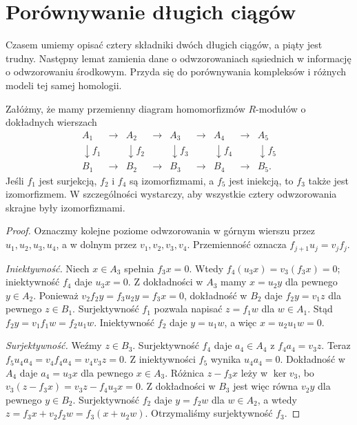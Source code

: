 \section{Porównywanie długich ciągów}
\label{sec:lemat-pieciu}

Czasem umiemy opisać cztery składniki
dwóch długich ciągów, a piąty jest trudny.
Następny lemat zamienia dane o odwzorowaniach
sąsiednich w informację o odwzorowaniu środkowym.
Przyda się do porównywania kompleksów
i różnych modeli tej samej homologii.

\begin{lemat}
\label{lem:pieciu}
Załóżmy, że mamy przemienny diagram
homomorfizmów $R$-modułów o dokładnych
wierszach
\[
\begin{array}{ccccccccc}
A_1&\longrightarrow&A_2&\longrightarrow&A_3&
 \longrightarrow&A_4&\longrightarrow&A_5\\
\downarrow f_1&&\downarrow f_2&&\downarrow f_3&&
\downarrow f_4&&\downarrow f_5\\
B_1&\longrightarrow&B_2&\longrightarrow&B_3&
 \longrightarrow&B_4&\longrightarrow&B_5 .
\end{array}
\]
Jeśli $f_1$ jest surjekcją, $f_2$ i $f_4$ są
izomorfizmami, a $f_5$ jest iniekcją,
to $f_3$ także jest izomorfizmem.
W szczególności wystarczy, aby wszystkie cztery
odwzorowania skrajne były izomorfizmami.
\end{lemat}
\begin{proof}
Oznaczmy kolejne poziome odwzorowania w górnym
wierszu przez $u_1,u_2,u_3,u_4$,
a w dolnym przez $v_1,v_2,v_3,v_4$.
Przemienność oznacza
$f_{j+1}u_j=v_jf_j$.

\emph{Iniektywność.} Niech $x\in A_3$
spełnia $f_3x=0$.
Wtedy
$f_4(u_3x)=v_3(f_3x)=0$;
iniektywność $f_4$ daje $u_3x=0$.
Z dokładności w $A_3$ mamy
$x=u_2y$ dla pewnego $y\in A_2$.
Ponieważ
$v_2f_2y=f_3u_2y=f_3x=0$,
dokładność w $B_2$ daje
$f_2y=v_1z$ dla pewnego $z\in B_1$.
Surjektywność $f_1$ pozwala napisać
$z=f_1w$ dla $w\in A_1$.
Stąd $f_2y=v_1f_1w=f_2u_1w$.
Iniektywność $f_2$ daje $y=u_1w$,
a więc $x=u_2u_1w=0$.

\emph{Surjektywność.} Weźmy $z\in B_3$.
Surjektywność $f_4$ daje $a_4\in A_4$
z $f_4a_4=v_3z$. Teraz
$f_5u_4a_4=v_4f_4a_4=v_4v_3z=0$.
Z iniektywności $f_5$ wynika
$u_4a_4=0$. Dokładność w $A_4$
daje $a_4=u_3x$ dla pewnego
$x\in A_3$. Różnica
$z-f_3x$ leży w $\ker v_3$,
bo $v_3(z-f_3x)=v_3z-f_4u_3x=0$.
Z dokładności w $B_3$ jest więc
równa $v_2y$ dla pewnego $y\in B_2$.
Surjektywność $f_2$ daje
$y=f_2w$ dla $w\in A_2$, a wtedy
$z=f_3x+v_2f_2w
=f_3(x+u_2w)$.
Otrzymaliśmy surjektywność $f_3$.
\end{proof}

